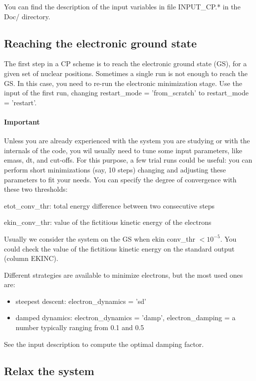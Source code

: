 \documentclass[12pt,a4paper]{article}
\begin{document}
You can find the description of the input variables in file INPUT\_CP.* 
in the Doc/ directory. 

\subsection{Reaching the electronic ground state}

The first step in a CP scheme is to reach the electronic 
ground state (GS), for a given set of nuclear positions.
Sometimes a single run is not enough to reach the GS. In this case,
you need to re-run the electronic minimization stage. Use the input 
of the first run, changing restart\_mode = 'from\_scratch' to 
restart\_mode = 'restart'.
   
\paragraph{Important} Unless you are already experienced with the system 
you are studying or with the internals of the code, you wil usually need 
to tune some input parameters, like emass, dt, and cut-offs. For this 
purpose, a few trial runs could be useful: you can perform short
minimizations (say, 10 steps) changing and adjusting these parameters 
to fit your needs. You can specify the degree of convergence with these
two thresholds:

etot\_conv\_thr: total energy difference between two consecutive steps

ekin\_conv\_thr: value of the fictitious kinetic energy of the electrons
   
Usually we consider the system on the GS when ekin conv\_thr $ < 10^{-5}$.
You could check the value of the fictitious kinetic energy on the standard 
output (column EKINC).

Different strategies are available to minimize electrons, but the most used 
ones are:
\begin{itemize}
\item steepest descent: electron\_dynamics = 'sd'
\item damped dynamics: electron\_dynamics = 'damp',
  electron\_damping = a number typically ranging from 0.1 and 0.5 
\end{itemize}
See the input description to compute the optimal damping factor.

\subsection{Relax the system}
\end{document}
